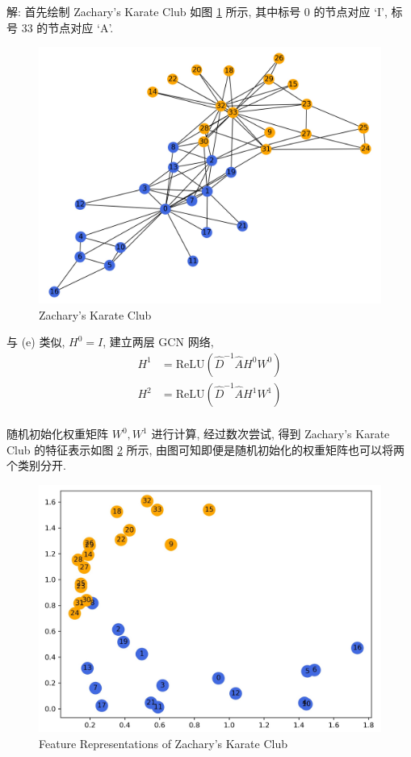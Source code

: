 \documentclass[openany]{ctexbook}
\theoremstyle{kaiti}
\theoremstyle{normal}
\begin{document}
解: 首先绘制 Zachary's Karate Club 如图 \ref{fig:zkc_init} 所示, 其中标号 0 的节点对应 `I', 标号 33 的节点对应 `A'.

\begin{figure}[htbp]
  \centering
  \includegraphics[width=12cm]{zkc_init.jpg}
  \caption{Zachary's Karate Club}
  \label{fig:zkc_init}
\end{figure}

与 (e) 类似, $H^0=I$, 建立两层 GCN 网络, 
\begin{equation}
  \begin{aligned}
    H^1 &=\mathrm{ReLU}(\hat{D}^{-1}\hat{A}H^0W^0)\\
    H^2 &=\mathrm{ReLU}(\hat{D}^{-1}\hat{A}H^1W^1)\\
  \end{aligned}
\end{equation}

随机初始化权重矩阵 $W^0,W^1$ 进行计算, 经过数次尝试, 得到 Zachary's Karate Club 的特征表示如图 \ref{fig:zkc_gcn} 所示, 由图可知即便是随机初始化的权重矩阵也可以将两个类别分开.

\begin{figure}[htbp]
  \centering
  \includegraphics[width=12cm]{zkc_gcn.jpg}
  \caption{Feature Representations of Zachary's Karate Club}
  \label{fig:zkc_gcn}
\end{figure}
\end{document}
